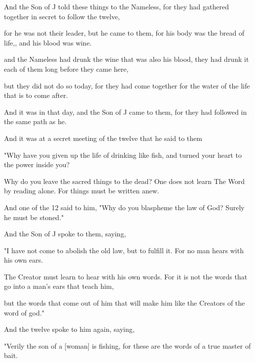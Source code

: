 \Sentence
{ \hX{} }
{ \eX{} }
{
And the Son of J told these things to the Nameless, for they had gathered together in secret to follow the twelve,
}

\Sentence
{ \hX{} }
{ \eX{} }
{
for he was not their leader, but he came to them, for his body was the bread of life,, and his blood was wine.
}

\Sentence
{ \hX{} }
{ \eX{} }
{
and the Nameless had drunk the wine that was also his blood, they had drunk it each of them long before they came here,
}

\Sentence
{ \hX{} }
{ \eX{} }
{
but they did not do so today, for they had come together for the water of the life that is to come after.
}

\Sentence
{ \hX{} }
{ \eX{} }
{
And it was in that day, and the Son of J came to them, for they had followed in the same path as he.
}

\Sentence
{ \hX{} }
{ \eX{} }
{
And it was at a secret meeting of the twelve that he said to them
}

\Sentence
{ \hX{} }
{ \eX{} }
{
"Why have you given up the life of drinking like fish, and turned your heart to the power inside you?
}

\Sentence
{ \hX{} }
{ \eX{} }
{
Why do you leave the sacred things to the dead? One does not learn The Word by reading alone. For things must be written anew.
}

\Sentence
{ \hX{} }
{ \eX{} }
{
And one of the 12 said to him, "Why do you blaspheme the law of God? Surely he must be stoned."
}

\Sentence
{ \hX{} }
{ \eX{} }
{
And the Son of J spoke to them, saying,
}

\Sentence
{ \hX{} }
{ \eX{} }
{
"I have not come to abolish the old law, but to fulfill it. For no man hears with his own ears.
}

\Sentence
{ \hX{} }
{ \eX{} }
{
The Creator must learn to hear with his own words. For it is not the words that go into a man's ears that teach him,
}

\Sentence
{ \hX{} }
{ \eX{} }
{
but the words that come out of him that will make him like the Creators of the word of god."
}

\Sentence
{ \hX{} }
{ \eX{} }
{
And the twelve spoke to him again, saying,
}

\Sentence
{ \hX{} }
{ \eX{} }
{
"Verily the son of a [woman] is fishing, for these are the words of a true master of bait.
}

